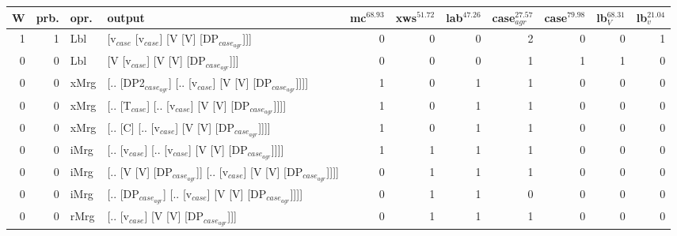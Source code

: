 \begin{tabularx}{\linewidth}{rrlXrrrrrrr}
\hline
   W &   prb. & opr.   & output                                                         &   mc$^{68.93}$ &   xws$^{51.72}$ &   lab$^{47.26}$ &   case$_{agr}^{27.57}$ &   case$^{79.98}$ &   lb$_{V}^{68.31}$ &   lb$_{v}^{21.04}$ \\
\hline
   1 &   1 & Lbl  & [v$_{case}$ [v$_{case}$] [V [V] [DP$_{case_{agr}}$]]]                        &            0 &             0 &             0 &                  2 &              0 &              0 &              1 \\
   0 &   0 & Lbl  & [V [v$_{case}$] [V [V] [DP$_{case_{agr}}$]]]                             &            0 &             0 &             0 &                  1 &              1 &              1 &              0 \\
   0 &   0 & xMrg & [.. [DP2$_{case_{agr}}$] [.. [v$_{case}$] [V [V] [DP$_{case_{agr}}$]]]]        &            1 &             0 &             1 &                  1 &              0 &              0 &              0 \\
   0 &   0 & xMrg & [.. [T$_{case}$] [.. [v$_{case}$] [V [V] [DP$_{case_{agr}}$]]]]              &            1 &             0 &             1 &                  1 &              0 &              0 &              0 \\
   0 &   0 & xMrg & [.. [C] [.. [v$_{case}$] [V [V] [DP$_{case_{agr}}$]]]]                   &            1 &             0 &             1 &                  1 &              0 &              0 &              0 \\
   0 &   0 & iMrg & [.. [v$_{case}$] [.. [v$_{case}$] [V [V] [DP$_{case_{agr}}$]]]]              &            1 &             1 &             1 &                  1 &              0 &              0 &              0 \\
   0 &   0 & iMrg & [.. [V [V] [DP$_{case_{agr}}$]] [.. [v$_{case}$] [V [V] [DP$_{case_{agr}}$]]]] &            0 &             1 &             1 &                  1 &              0 &              0 &              0 \\
   0 &   0 & iMrg & [.. [DP$_{case_{agr}}$] [.. [v$_{case}$] [V [V] [DP$_{case_{agr}}$]]]]         &            0 &             1 &             1 &                  0 &              0 &              0 &              0 \\
   0 &   0 & rMrg & [.. [v$_{case}$] [V [V] [DP$_{case_{agr}}$]]]                            &            0 &             1 &             1 &                  1 &              0 &              0 &              0 \\
\hline
\end{tabularx}\endgroup\\
